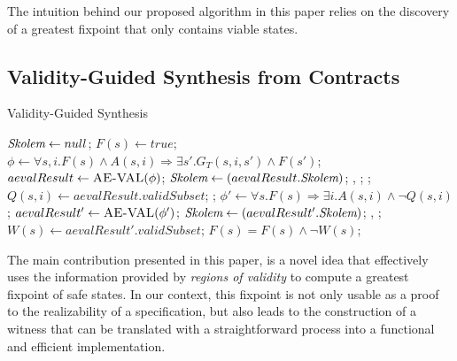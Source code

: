 The intuition behind our proposed algorithm in this paper relies on the
discovery of a greatest fixpoint that only contains viable states.


\subsection{Validity-Guided Synthesis from Contracts}
\label{sec:synth}

\begin{algorithm*}[!t]
\footnotesize
\caption{Validity-Guided Synthesis}\label{alg:synthesis}
\begin{algorithmic}
	\State $\textit{Skolem} \gets null$;
	\State $F(s) \gets true$;
		\State $\phi \gets \forall s,i. F(s) \land A(s,i) \Rightarrow \exists s'.
			G_{T}(s,i,s') \land F(s')$;
		\State $aevalResult \gets \textsc{AE-VAL}(\phi)$;
			\State $\textit{Skolem} \gets (aevalResult.\textit{Skolem})$;
				\Return \realizable, %
		 		\skolems;
			\Else{}
		 		\Return \unrealizable;
		 	\EndIf
		\Else
			\State $Q(s,i) \gets aevalResult.validSubset$;
				\Return \unrealizable;
			\EndIf
			\State $\phi' \gets \forall s. F(s) \Rightarrow \exists i. A(s,i) \land \lnot
			Q(s,i)$;
			\State $aevalResult' \gets \textsc{AE-VAL}(\phi')$;		
				\State $\textit{Skolem} \gets (aevalResult'.\textit{Skolem})$;			
				\Return \unrealizable, \skolems;
			\Else{}
				\State $W(s) \gets aevalResult'.validSubset$;
				\State $F(s) = F(s) \land \lnot W(s)$;
			\EndIf
		\EndIf
	\EndWhile
\EndProcedure	
\end{algorithmic}
\end{algorithm*}

The main contribution presented in this paper, is a novel idea that effectively
uses the information provided by \textit{regions of validity} to compute a
greatest fixpoint of safe states. In our context, this fixpoint is not only
usable as a proof to the realizability of a specification, but also leads to the
construction of a witness that can be translated with a straightforward process
into a functional and efficient implementation.


